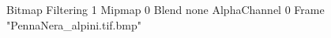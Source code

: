 {Bitmap
	{Filtering 1}
	{Mipmap 0}
	{Blend none}
	{AlphaChannel 0}
	{Frame "PennaNera_alpini.tif.bmp"}
}
